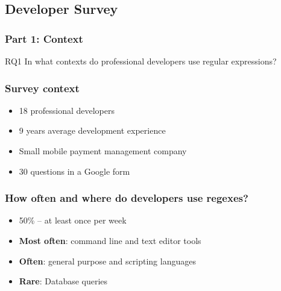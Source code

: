 \subsection{Developer Survey}

\begin{frame}
\frametitle{Part 1: Context}

\begin{block}{RQ1}
In what contexts do professional developers use regular expressions?
\end{block}
\end{frame}

\begin{frame}
\frametitle{Survey context}

\begin{itemize}
	\item 18 professional developers 
	\item 9 years average development experience
	\item Small mobile payment management company
	\item 30 questions in a Google form
\end{itemize}
\end{frame}

\begin{frame}
\frametitle{How often and where do developers use regexes?}

\begin{itemize}
	\item 50\%  -- at least once per week
\vspace{12pt}
	\item<2-> {\bf Most often}: command line and text editor tools
	\item<2-> {\bf Often}: general purpose and scripting  languages
	\item<2-> {\bf Rare}: Database queries
\end{itemize}
\end{frame}


